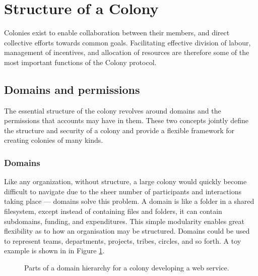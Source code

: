 \section{Structure of a Colony}\label{sec:colony-structure}
Colonies exist to enable collaboration between their members, and direct collective efforts towards common goals. Facilitating effective division of labour, management of incentives, and allocation of resources are therefore some of the most important functions of the Colony protocol.

\subsection{Domains and permissions}\label{sec:domains}\label{sec:permissions}

The essential structure of the colony revolves around domains and the permissions that accounts may have in them. These two concepts jointly define the structure and security of a colony and provide a flexible framework for creating colonies of many kinds.

\subsubsection{Domains}

Like any organization, without structure, a large colony would quickly become difficult to navigate due to the sheer number of participants and interactions taking place --- domains solve this problem. A domain is like a folder in a shared filesystem, except instead of containing files and folders, it can contain subdomains, funding, and expenditures. This simple modularity enables great flexibility as to how an organisation may be structured. Domains could be used to represent teams, departments, projects, tribes, circles, and so forth. A toy example is shown in in Figure \ref{fig:domainhierarchysample}.

\begin{figure}[h]
    \centering
 \caption{Parts of a domain hierarchy for a colony developing a web service.}
 \label{fig:domainhierarchysample}
\end{figure}

